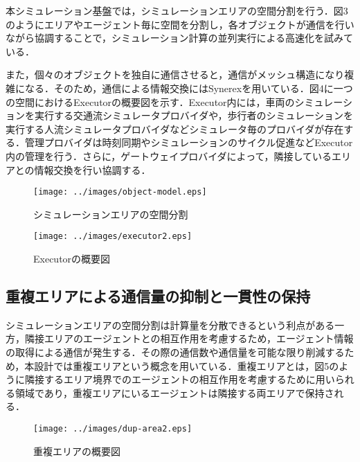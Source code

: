 \documentclass[originalpaper]{jsaiart}     %
\begin{document}
本シミュレーション基盤では，シミュレーションエリアの空間分割を行う．図3のようにエリアやエージェント毎に空間を分割し，各オブジェクトが通信を行いながら協調することで，シミュレーション計算の並列実行による高速化を試みている．

また，個々のオブジェクトを独自に通信させると，通信がメッシュ構造になり複雑になる．そのため，通信による情報交換にはSynerexを用いている．図4に一つの空間におけるExecutorの概要図を示す．Executor内には，車両のシミュレーションを実行する交通流シミュレータプロバイダや，歩行者のシミュレーションを実行する人流シミュレータプロバイダなどシミュレータ毎のプロバイダが存在する．管理プロバイダは時刻同期やシミュレーションのサイクル促進などExecutor内の管理を行う．さらに，ゲートウェイプロバイダによって，隣接しているエリアとの情報交換を行い協調する．

\begin{figure}[t]
    \begin{center}
        \texttt{[image: ../images/object-model.eps]}
        \label{fig:object_model}
    \end{center}
    \caption{シミュレーションエリアの空間分割}
\end{figure}

\begin{figure}[t]
    \begin{center}
        \texttt{[image: ../images/executor2.eps]}
        \label{fig:overall_structure}
    \end{center}
    \caption{Executorの概要図}
\end{figure}




\subsection{重複エリアによる通信量の抑制と一貫性の保持}

シミュレーションエリアの空間分割は計算量を分散できるという利点がある一方，隣接エリアのエージェントとの相互作用を考慮するため，エージェント情報の取得による通信が発生する．その際の通信数や通信量を可能な限り削減するため，本設計では重複エリアという概念を用いている．重複エリアとは，図5のように隣接するエリア境界でのエージェントの相互作用を考慮するために用いられる領域であり，重複エリアにいるエージェントは隣接する両エリアで保持される．

\begin{figure}[t]
    \begin{center}
        \texttt{[image: ../images/dup-area2.eps]}
    \end{center}
    \caption{重複エリアの概要図}
    \label{dummy}
\end{figure}
\end{document}
